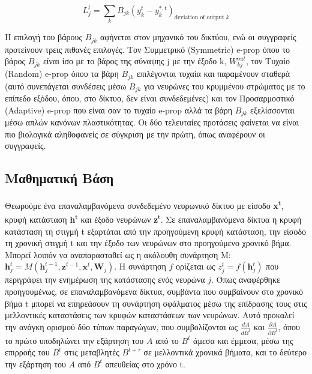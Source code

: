 \documentclass[12pt]{report}
\begin{document}
\begin{equation}
    L_{j}^{t}=\sum_{k} B_{j k}\left(y_{k}^{t}-y_{k}^{*, t}\right)_{\text {deviation of output } k}
\end{equation}

Η επιλογή του βάρους \(B_{jk}\) αφήνεται στον μηχανικό του δικτύου, ενώ οι συγγραφείς προτείνουν τρεις πιθανές επιλογές. Τον Συμμετρικό (\textlatin{Symmetric}) \textlatin{e-prop} όπου το βάρος \(B_{jk}\) είναι ίσο με το βάρος της σύναψης \textlatin{j} με την έξοδο \textlatin{k}, \(W_{kj}^{out}\), τον Τυχαίο (\textlatin{Random}) \textlatin{e-prop} όπου τα βάρη \(B_{jk}\) επιλέγονται τυχαία και παραμένουν σταθερά (αυτό συνεπάγεται συνδέσεις μέσω \(B_{jk}\) για νευρώνες του κρυμμένου στρώματος με το επίπεδο εξόδου, όπου, στο δίκτυο, δεν είναι συνδεδεμένες) και τον Προσαρμοστικό (\textlatin{Adaptive}) \textlatin{e-prop} που είναι σαν το τυχαίο \textlatin{e-prop} αλλά τα βάρη \(B_{jk}\) εξελίσσονται μέσω απλών κανόνων πλαστικότητας. Οι δύο τελευταίες προτάσεις φαίνεται να είναι πιο βιολογικά αληθοφανείς σε σύγκριση με την πρώτη, όπως αναφέρουν οι συγγραφείς.

\subsection{Μαθηματική Βάση}

Θεωρούμε ένα επαναλαμβανόμενα συνδεδεμένο νευρωνικό δίκτυο με είσοδο \textlatin{\textbf{x}\textsuperscript{t}}, κρυφή κατάσταση \textlatin{\textbf{h}\textsuperscript{t}} και έξοδο νευρώνων \textlatin{\textbf{z}\textsuperscript{t}}. Σε επαναλαμβανόμενα δίκτυα η κρυφή κατάσταση τη στιγμή \textlatin{t} εξαρτάται από την προηγούμενη κρυφή κατάσταση, την είσοδο τη χρονική στιγμή \textlatin{t} και την έξοδο των νευρώνων στο προηγούμενο χρονικό βήμα. Μπορεί λοιπόν να αναπαρασταθεί ως η ακόλουθη συνάρτηση M: $\mathbf{h}_{j}^{t} = M\left(\mathbf{h}_{j}^{t-1}, \mathbf{z}^{t-1}, \mathbf{x}^{t}, \mathbf{W}_{j}\right)$. Η συνάρτηση \(f\) ορίζεται ως $z_{j}^{t} = f\left(\mathbf{h}_{j}^{t}\right)$ που περιγράφει την ενημέρωση της κατάστασης ενός νευρώνα \(j\). Όπως αναφέρθηκε προηγουμένως, σε επαναλαμβανόμενα δίκτυα, συμβάντα που συμβαίνουν στο χρονικό βήμα \textlatin{t} μπορεί να επηρεάσουν τη συνάρτηση σφάλματος μέσω της επίδρασης τους στις μελλοντικές καταστάσεις των κρυφών καταστάσεων των νευρώνων. Αυτό προκαλεί την ανάγκη ορισμού δύο τύπων παραγώγων, που συμβολίζονται ως \(\frac{dA}{dB^t}\) και \(\frac{\partial A}{\partial B^t}\), όπου το πρώτο υποδηλώνει την εξάρτηση του \(A\) από το \(B^t\) άμεσα και έμμεσα, μέσω της επιρροής του \(B^t\) στις μεταβλητές \(B^{t+\tau}\) σε μελλοντικά χρονικά βήματα, και το δεύτερο την εξάρτηση του \(A\) από \(B^t\) απευθείας στο χρόνο \textlatin{t}.
\end{document}
